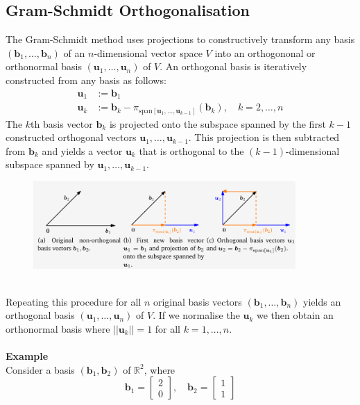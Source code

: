 \documentclass{report}
\begin{document}
\subsection{Gram-Schmidt Orthogonalisation}%
The Gram-Schmidt method uses projections to constructively transform any basis 
$(\bm{b}_1,\ldots,\bm{b}_n)$ of an $n$-dimensional vector space $V$ into an orthogononal or orthonormal basis 
$(\bm{u}_1,\ldots,\bm{u}_n)$ of $V$. An orthogonal basis is iteratively constructed from any basis as follows:
\begin{align*}
\bm{u}_1&:=\bm{b}_1\\
\bm{u}_k&:=\bm{b}_k-\pi_{\text{span}[\bm{u}_1,\ldots,\bm{u}_{k-1}]}(\bm{b}_k),\quad
k=2,\ldots,n
\end{align*}
The $k$th basis vector $\bm{b}_k$ is projected onto the subspace spanned by the first $k-1$ constructed
orthogonal vectors $\bm{u}_1,\ldots,\bm{u}_{k-1}$. This
projection is then subtracted from $\bm{b}_k$ and yields
a vector $\bm{u}_k$ that is orthogonal to the 
$(k-1)$-dimensional subspace spanned by $\bm{u}_1,\ldots,\bm{u}_{k-1}$.
\begin{figure}[h]
\includegraphics[width=10cm]{10}\\
\centering
\end{figure}\\
Repeating this procedure for all $n$ original basis vectors $(\bm{b}_1,\ldots,\bm{b}_n)$ 
yields an orthogonal basis $(\bm{u}_1,\ldots,\bm{u}_n)$ of $V$.
If we normalise the $\bm{u}_k$ we then obtain an orthonormal basis where $||\bm{u}_k||=1$ for all $k=1,\ldots,n$.\\
\vspace{1mm}\\
\textbf{Example}\\
Consider a basis $(\bm{b}_1,\bm{b}_2)$ of $\mathbb{R}^2$, where
\begin{equation*}
\bm{b}_1=\begin{bmatrix}2\\0\end{bmatrix},\quad
\bm{b}_2=\begin{bmatrix}1\\1\end{bmatrix}
\end{equation*}
\end{document}
